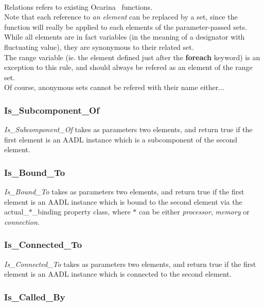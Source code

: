 \paragraph{}
Relations refers to existing Ocarina~\cite{HZP07} functions.\\
Note that each reference to \textit{an element} can be 
replaced by {a set}, since the function will really be 
applied to each elements of the parameter-passed sets. 
While all elements are in fact variables (in the meaning 
of a designator with fluctuating value), they are synonymous 
to their related set.\\
The range variable (ie. the element defined just after the 
\textbf{foreach} keyword) is an exception to this rule, and 
should always be refered as an element of the range set.\\
Of course, anonymous sets cannot be refered with their name 
either...

\subsubsection {Is\_Subcomponent\_Of}

\textit{Is\_Subcomponent\_Of} takes as parameters two elements,
and return true if the first element is an AADL instance which 
is a subcomponent of the second element.

\subsubsection {Is\_Bound\_To}

\textit{Is\_Bound\_To} takes as parameters two elements,
and return true if the first element is an AADL instance which 
is bound to the second element via the actual\_$*$\_binding 
property class, where $*$ can be either \textit{processor},
\textit{memory} or \textit{connection}.

\subsubsection {Is\_Connected\_To}

\textit{Is\_Connected\_To} takes as parameters two elements,
and return true if the first element is an AADL instance which 
is connected to the second element.

\subsubsection {Is\_Called\_By}

